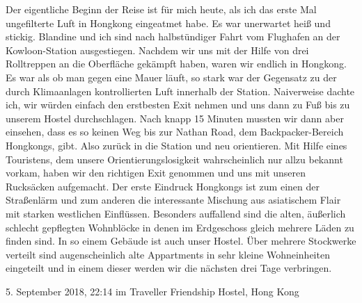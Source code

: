 \documentclass[11pt]{book}
\begin{document}
Der eigentliche Beginn der Reise ist für mich heute, als ich das erste Mal ungefilterte Luft in 
Hongkong eingeatmet habe. Es war unerwartet heiß und stickig. Blandine und ich sind nach halbstündiger
Fahrt vom Flughafen an der Kowloon-Station ausgestiegen. Nachdem wir uns mit der Hilfe von drei 
Rolltreppen an die Oberfläche gekämpft haben, waren wir endlich in Hongkong. Es war als ob man gegen 
eine Mauer läuft, so stark war der Gegensatz zu der durch Klimaanlagen kontrollierten Luft innerhalb 
der Station. Naiverweise dachte ich, wir würden einfach den erstbesten Exit nehmen und uns dann zu Fuß 
bis zu unserem Hostel durchschlagen. Nach knapp 15 Minuten mussten wir dann aber einsehen, dass es 
so keinen Weg bis zur Nathan Road, dem Backpacker-Bereich Hongkongs, gibt. Also zurück in die Station 
und neu orientieren. Mit Hilfe eines Touristens, dem unsere Orientierungslosigkeit wahrscheinlich nur 
allzu bekannt vorkam, haben wir den richtigen Exit genommen und uns mit unseren Rucksäcken aufgemacht. 
Der erste Eindruck Hongkongs ist zum einen der Straßenlärm und zum anderen die interessante Mischung 
aus asiatischem Flair mit starken westlichen Einflüssen. Besonders auffallend sind die alten, äußerlich 
schlecht gepflegten Wohnblöcke in denen im Erdgeschoss gleich mehrere Läden zu finden sind. In so einem 
Gebäude ist auch unser Hostel. Über mehrere Stockwerke verteilt sind augenscheinlich alte Appartments in 
sehr kleine Wohneinheiten eingeteilt und in einem dieser werden wir die nächsten drei Tage verbringen.

5. September 2018, 22:14 im Traveller Friendship Hostel, Hong Kong
\end{document}
